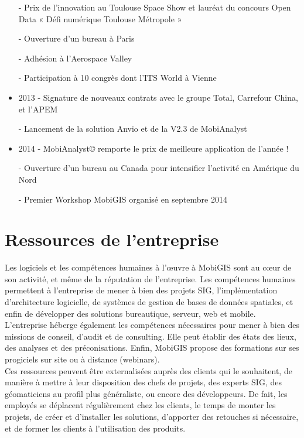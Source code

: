\begin{itemize}
		- Prix de l’innovation au Toulouse Space Show et lauréat du concours Open Data « Défi numérique Toulouse Métropole » 
    
		- Ouverture d’un bureau à Paris 
    
		- Adhésion à l’Aerospace Valley 
    
		- Participation à 10 congrès dont l’ITS World à Vienne 
\\
\item 2013 
    - Signature de nouveaux contrats avec le groupe Total, Carrefour China, et l’APEM 
    
		- Lancement de la solution Anvio et de la V2.3 de MobiAnalyst 
\\
\item 2014
    - MobiAnalyst© remporte le prix de meilleure application de l'année !
    
		- Ouverture d'un bureau au Canada pour intensifier l'activité en Amérique du Nord
    
		- Premier Workshop MobiGIS organisé en septembre 2014 

\end{itemize}



\section{Ressources de l'entreprise}

Les logiciels et les compétences humaines à l’\oe uvre à MobiGIS sont au c\oe ur de son activité, et même de la réputation de l’entreprise. Les compétences humaines permettent à l’entreprise de mener à bien des projets SIG, l'implémentation d’architecture logicielle, de systèmes de gestion de bases de données spatiales, et enfin de développer des solutions bureautique, serveur, web et mobile. \\

L’entreprise héberge également les compétences nécessaires pour mener à bien des missions de conseil, d’audit et de consulting. Elle peut établir des états des lieux, des analyses et des préconisations. Enfin, MobiGIS propose des formations sur ses progiciels sur site ou à distance (webinars). \\

Ces ressources peuvent être externalisées auprès des clients qui le souhaitent, de manière à mettre à leur disposition des chefs de projets, des experts SIG, des géomaticiens au profil plus généraliste, ou encore des développeurs. De fait, les employés se déplacent régulièrement chez les clients, le temps de monter les projets, de créer et d’installer les solutions, d’apporter des retouches si nécessaire, et de former les clients à l’utilisation des produits. \\

